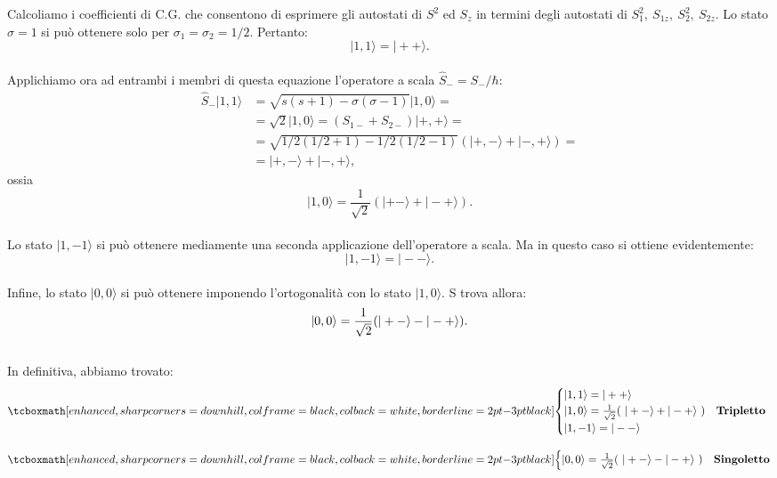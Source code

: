 \documentclass[a4paper,12pt,oneside]{book}
\begin{document}
Calcoliamo i coefficienti di C.G. che consentono di esprimere gli autostati di $S^2$ ed $S_z$ in termini degli autostati di $S_1^2 ,~ S_{1z}, ~ S_2^2, ~ S_{2z}$. Lo stato $\sigma=1$ si può ottenere solo per $\sigma_1=\sigma_2=1/2$. Pertanto:
	\begin{equation}
		|1,1\rangle = |++\rangle  .
	\end{equation}\\

Applichiamo ora ad entrambi i membri di questa equazione l'operatore a scala $\hat{S}_-=S_- /\hbar$:
	\begin{align}
		 \hat{S}_- |1,1\rangle & = \sqrt{s(s+1) - \sigma(\sigma -1)}  |1,0\rangle =\nonumber \\
		&=\sqrt{2} |1,0\rangle=  (S_{1-}+S_{2-})  |+,+\rangle =  \nonumber \\
		&= \sqrt{1/2 (1/2+1) -1/2 (1/2-1)} \left( |+,-\rangle + |-,+\rangle \right)= \nonumber \\
		&= |+,-\rangle   +   |-,+\rangle ,
	\end{align}
ossia
	\begin{equation}
		|1,0\rangle = \frac{1}{\sqrt{2}} (|+-\rangle + |-+\rangle) .
	\end{equation}\\
	
Lo stato $|1,-1\rangle$ si può ottenere mediamente una seconda applicazione dell'operatore a scala. Ma in questo caso si ottiene evidentemente:
	\begin{equation}
		|1,-1\rangle = |--\rangle .
	\end{equation}\\
	
Infine, lo stato $|0,0\rangle$ si può ottenere imponendo l'ortogonalità con lo stato $|1,0\rangle$. S trova allora:
	\begin{equation}
		|0,0\rangle = \frac{1}{\sqrt{2}} (|+-\rangle - |-+\rangle). \\
	\end{equation}\\
	
In definitiva, abbiamo trovato:
	\begin{align}
		&\tcboxmath[enhanced, sharp corners=downhill, colframe=black, colback=white, borderline={2pt}{-3pt}{black}]{
		\begin{cases} 
			|1,1\rangle = |++\rangle  \\
			|1,0\rangle = \frac{1}{\sqrt{2}} (~|+-\rangle + |-+\rangle ~)    & \mbox{\textrm{\textbf{Tripletto~}}} \\
			|1,-1\rangle = |--\rangle   \\
\end{cases}
		}\\[0.3cm]
		&\tcboxmath[enhanced, sharp corners=downhill, colframe=black, colback=white, borderline={2pt}{-3pt}{black}]{
		\begin{cases} 
			|0,0\rangle = \frac{1}{\sqrt{2}} (~|+-\rangle - |-+\rangle~)    & \mbox{\textrm{\textbf{Singoletto}}}\\
		\end{cases}
		}
	\end{align}
\end{document}
